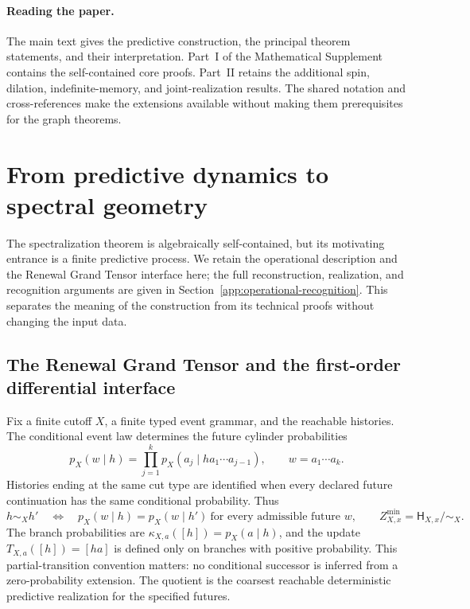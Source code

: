 \documentclass[11pt]{article}
\theoremstyle{definition}
\theoremstyle{remark}
\theoremstyle{definition}
\theoremstyle{remark}
\begin{document}

\paragraph{Reading the paper.}
The main text gives the predictive construction, the principal theorem statements,
and their interpretation.  Part~I of the Mathematical Supplement contains the
self-contained core proofs.  Part~II retains the additional spin, dilation,
indefinite-memory, and joint-realization results.  The shared notation and
cross-references make the extensions available without making them prerequisites
for the graph theorems.

\section{From predictive dynamics to spectral geometry}
\label{sec:finite-main}

The spectralization theorem is algebraically self-contained, but its motivating
entrance is a finite predictive process.  We retain the operational description
and the Renewal Grand Tensor interface here; the full reconstruction,
realization, and recognition arguments are given in
Section~\ref{app:operational-recognition}.  This separates the meaning of the
construction from its technical proofs without changing the input data.

\subsection{The Renewal Grand Tensor and the first-order differential interface}
\label{subsec:grand-tensor-main}

Fix a finite cutoff $X$, a finite typed event grammar, and the reachable
histories.  The conditional event law determines the future cylinder probabilities
\begin{equation}
 p_X(w\mid h)=\prod_{j=1}^k p_X(a_j\mid ha_1\cdots a_{j-1}),
 \qquad w=a_1\cdots a_k.
 \label{eq:overview-chain-law}
\end{equation}
Histories ending at the same cut type are identified when every declared future
continuation has the same conditional probability.  Thus
\begin{equation}
 h\sim_Xh'\quad\Longleftrightarrow\quad
 p_X(w\mid h)=p_X(w\mid h')\ \text{for every admissible future }w,
 \qquad Z_{X,x}^{\min}=\mathsf H_{X,x}/\!\sim_X.
 \label{eq:overview-predictive-state}
\end{equation}
The branch probabilities are $\kappa_{X,a}([h])=p_X(a\mid h)$, and the update
$T_{X,a}([h])=[ha]$ is defined only on branches with positive probability.
This partial-transition convention matters: no conditional successor is inferred
from a zero-probability extension.  The quotient is the coarsest reachable
deterministic predictive realization for the specified futures.
\end{document}
